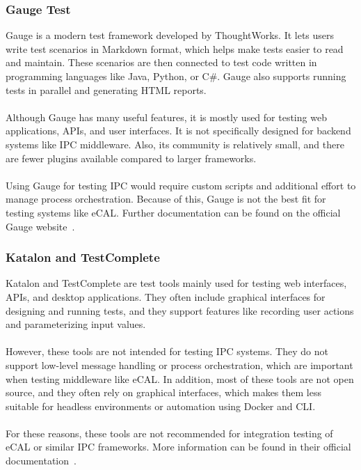 \subsubsection*{Gauge Test}

Gauge is a modern test framework developed by ThoughtWorks. It lets users write test scenarios in Markdown format, which helps make tests easier to read and maintain. These scenarios are then connected to test code written in programming languages like Java, Python, or C\#. Gauge also supports running tests in parallel and generating HTML reports.
\\
\\
Although Gauge has many useful features, it is mostly used for testing web applications, APIs, and user interfaces. It is not specifically designed for backend systems like IPC middleware. Also, its community is relatively small, and there are fewer plugins available compared to larger frameworks.
\\
\\
Using Gauge for testing IPC would require custom scripts and additional effort to manage process orchestration. Because of this, Gauge is not the best fit for testing systems like eCAL. Further documentation can be found on the official Gauge website~\cite{GaugeDocs}.

\subsubsection*{Katalon and TestComplete}

 Katalon and TestComplete are test tools mainly used for testing web interfaces, APIs, and desktop applications. They often include graphical interfaces for designing and running tests, and they support features like recording user actions and parameterizing input values.
\\
\\
However, these tools are not intended for testing IPC systems. They do not support low-level message handling or process orchestration, which are important when testing middleware like eCAL. In addition, most of these tools are not open source, and they often rely on graphical interfaces, which makes them less suitable for headless environments or automation using Docker and CLI.
\\
\\
For these reasons, these tools are not recommended for integration testing of eCAL or similar IPC frameworks. More information can be found in their official documentation~\cite{KatalonDocs,TestCompleteDocs}.

